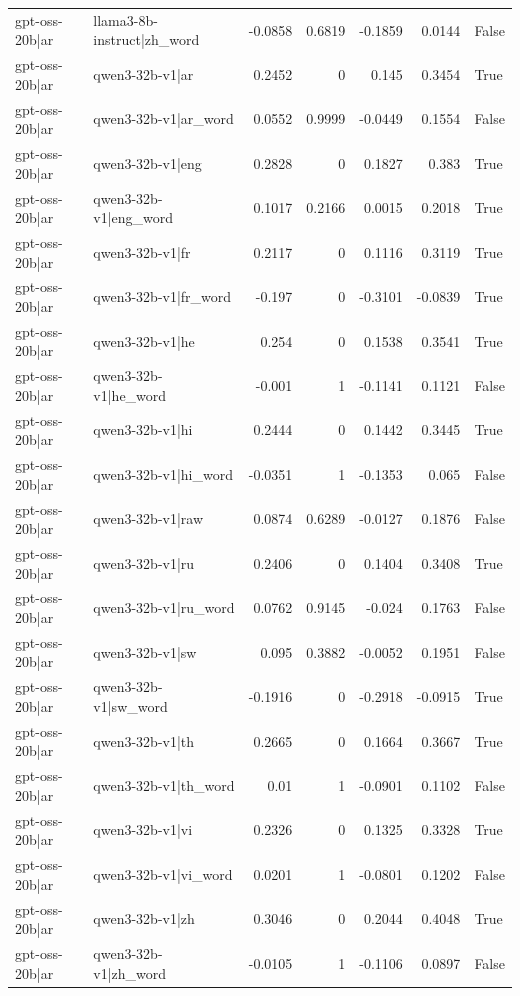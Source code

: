 \begin{table}
\begin{tabular}{l l r r r r l}
gpt-oss-20b|ar & llama3-8b-instruct|zh_word & -0.0858 & 0.6819 & -0.1859 & 0.0144 & False \\
gpt-oss-20b|ar & qwen3-32b-v1|ar & 0.2452 & 0 & 0.145 & 0.3454 & True \\
gpt-oss-20b|ar & qwen3-32b-v1|ar_word & 0.0552 & 0.9999 & -0.0449 & 0.1554 & False \\
gpt-oss-20b|ar & qwen3-32b-v1|eng & 0.2828 & 0 & 0.1827 & 0.383 & True \\
gpt-oss-20b|ar & qwen3-32b-v1|eng_word & 0.1017 & 0.2166 & 0.0015 & 0.2018 & True \\
gpt-oss-20b|ar & qwen3-32b-v1|fr & 0.2117 & 0 & 0.1116 & 0.3119 & True \\
gpt-oss-20b|ar & qwen3-32b-v1|fr_word & -0.197 & 0 & -0.3101 & -0.0839 & True \\
gpt-oss-20b|ar & qwen3-32b-v1|he & 0.254 & 0 & 0.1538 & 0.3541 & True \\
gpt-oss-20b|ar & qwen3-32b-v1|he_word & -0.001 & 1 & -0.1141 & 0.1121 & False \\
gpt-oss-20b|ar & qwen3-32b-v1|hi & 0.2444 & 0 & 0.1442 & 0.3445 & True \\
gpt-oss-20b|ar & qwen3-32b-v1|hi_word & -0.0351 & 1 & -0.1353 & 0.065 & False \\
gpt-oss-20b|ar & qwen3-32b-v1|raw & 0.0874 & 0.6289 & -0.0127 & 0.1876 & False \\
gpt-oss-20b|ar & qwen3-32b-v1|ru & 0.2406 & 0 & 0.1404 & 0.3408 & True \\
gpt-oss-20b|ar & qwen3-32b-v1|ru_word & 0.0762 & 0.9145 & -0.024 & 0.1763 & False \\
gpt-oss-20b|ar & qwen3-32b-v1|sw & 0.095 & 0.3882 & -0.0052 & 0.1951 & False \\
gpt-oss-20b|ar & qwen3-32b-v1|sw_word & -0.1916 & 0 & -0.2918 & -0.0915 & True \\
gpt-oss-20b|ar & qwen3-32b-v1|th & 0.2665 & 0 & 0.1664 & 0.3667 & True \\
gpt-oss-20b|ar & qwen3-32b-v1|th_word & 0.01 & 1 & -0.0901 & 0.1102 & False \\
gpt-oss-20b|ar & qwen3-32b-v1|vi & 0.2326 & 0 & 0.1325 & 0.3328 & True \\
gpt-oss-20b|ar & qwen3-32b-v1|vi_word & 0.0201 & 1 & -0.0801 & 0.1202 & False \\
gpt-oss-20b|ar & qwen3-32b-v1|zh & 0.3046 & 0 & 0.2044 & 0.4048 & True \\
gpt-oss-20b|ar & qwen3-32b-v1|zh_word & -0.0105 & 1 & -0.1106 & 0.0897 & False \\

\end{tabular}
\end{table}
